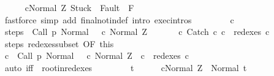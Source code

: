 \begin{isabellebody}
\ \ \ \ \isamarkupfalse%
\ {\isachardoublequoteopen}{\isasymGamma}{\isasymturnstile}{\isasymlangle}cNormal\ Z{\isasymrangle}\ {\isasymRightarrow}{\isasymnotin}{\isacharparenleft}{\isacharbraceleft}Stuck{\isacharbraceright}\ {\isasymunion}\ Fault\ {\isacharbackquote}\ {\isacharparenleft}{\isacharminus}F{\isacharparenright}{\isacharparenright}{\isachardoublequoteclose}\isanewline
\ \ \ \ \ \ \isamarkupfalse%
\ {\isacharparenleft}fastforce\ simp\ add{\isacharcolon}\ final{\isacharunderscore}notin{\isacharunderscore}def\ intro{\isacharcolon}\ exec{\isachardot}intros{\isacharparenright}\isanewline
\ \ \isamarkupfalse%
\isanewline
\ \ \ \ \isamarkupfalse%
\ c{\isacharprime}\isanewline
\ \ \ \ \isamarkupfalse%
\ steps{\isacharcolon}\ {\isachardoublequoteopen}{\isasymGamma}{\isasymturnstile}\ {\isacharparenleft}Call\ p{\isacharcomma}\ Normal\ {\isasymsigma}{\isacharparenright}\ {\isasymrightarrow}\isactrlsup {\isacharplus}\ {\isacharparenleft}c{\isacharprime}{\isacharcomma}\ Normal\ Z{\isacharparenright}{\isachardoublequoteclose}\ \isanewline
\ \ \ \ \isamarkupfalse%
\ c{\isacharprime}{\isacharcolon}\ {\isachardoublequoteopen}Catch\ c\ c\ {\isasymin}\ redexes\ c{\isacharprime}{\isachardoublequoteclose}\isanewline
\ \ \ \ \isamarkupfalse%
\ steps\ redexes{\isacharunderscore}subset\ {\isacharbrackleft}OF\ this{\isacharbrackright}\isanewline
\ \ \ \ \isamarkupfalse%
\ {\isachardoublequoteopen}{\isasymexists}c{\isacharprime}{\isachardot}\ {\isasymGamma}{\isasymturnstile}\ {\isacharparenleft}Call\ p{\isacharcomma}\ Normal\ {\isasymsigma}{\isacharparenright}\ {\isasymrightarrow}\isactrlsup {\isacharplus}\ {\isacharparenleft}c{\isacharprime}{\isacharcomma}\ Normal\ Z{\isacharparenright}\ {\isasymand}\ c\ {\isasymin}\ redexes\ c{\isacharprime}{\isachardoublequoteclose}\isanewline
\ \ \ \ \ \ \isamarkupfalse%
\ {\isacharparenleft}auto\ iff{\isacharcolon}\ \ root{\isacharunderscore}in{\isacharunderscore}redexes{\isacharparenright}\isanewline
\ \ \isamarkupfalse%
\isanewline
\ \ \ \ \isamarkupfalse%
\ t\isanewline
\ \ \ \ \isamarkupfalse%
\ {\isachardoublequoteopen}{\isasymGamma}{\isasymturnstile}{\isasymlangle}cNormal\ Z{\isasymrangle}\ {\isasymRightarrow}\ Normal\ t{\isachardoublequoteclose}\isanewline
\ \ \ \ \isamarkupfalse%

\end{isabellebody}
